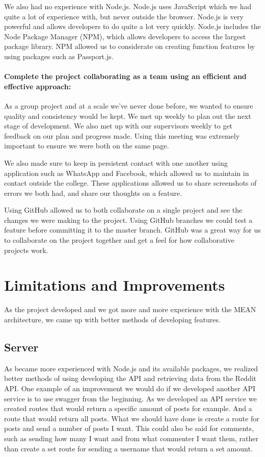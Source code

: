 We also had no experience with Node.js. Node.js uses JavaScript which we had quite a lot of experience with, but never outside the browser. Node.js is very powerful and allows developers to do quite a lot very quickly. Node.js includes the Node Package Manager (NPM), which allows developers to access the largest package library. NPM allowed us to considerate on creating function features by using packages such as Passport.js.

\paragraph{Complete  the project collaborating as a team using an efficient and effective approach:}
As a group project and at a scale we've never done before, we wanted to ensure quality and consistency would be kept. We met up weekly to plan out the next stage of development. We also met up with our supervisors weekly to get feedback on our plan and progress made. Using this meeting was extremely important to ensure we were both on the same page.

We also made sure to keep in persistent contact with one another using application such as WhatsApp and Facebook, which allowed us to maintain in contact outside the college. These applications allowed us to share screenshots of errors we both had, and share our thoughts on a feature.

Using GitHub allowed us to both collaborate on a single project and see the changes we were making to the project. Using GitHub branches we could test a feature before committing it to the master branch. GitHub was a great way for us to collaborate on the project together and get a feel for how collaborative projects work.

\section{Limitations and Improvements}
As the project developed and we got more and more experience with the MEAN architecture, we came up with better methods of developing features. 

\subsection{Server}
As became more experienced with Node.js and its available packages, we realized better methods of using developing the API and retrieving data from the Reddit API. One example of an improvement we would do if we developed another API service is to use swagger from the beginning. As we developed an API service we created routes that would return a specific amount of posts for example. And a route that would return all posts. What we should have done is create a route for posts and send a number of posts I want. This could also be said for comments, such as sending how many I want and from what commenter I want them, rather than create a set route for sending a username that would return a set amount.

